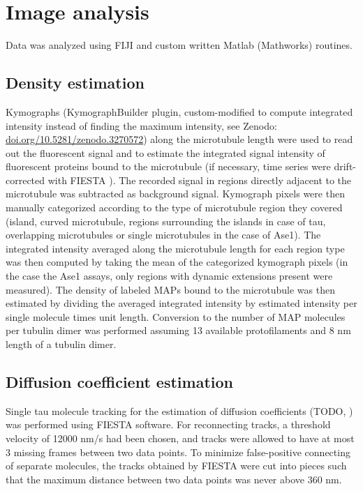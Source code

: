 \section{Image analysis}
\label{methods_analysis}
Data was analyzed using FIJI \parencite{Schindelin2012} and custom written Matlab (Mathworks) routines. 
\subsection{Density estimation}
Kymographs (KymographBuilder plugin, custom-modified to compute integrated intensity instead of finding the maximum intensity, see Zenodo: \url{doi.org/10.5281/zenodo.3270572}) along the microtubule length were used to read out the fluorescent signal and to estimate the integrated signal intensity of fluorescent proteins bound to the microtubule (if necessary, time series were drift-corrected with FIESTA \parencite{RUHNOW20112820}). The recorded signal in regions directly adjacent to the microtubule was subtracted as background signal. Kymograph pixels were then manually categorized according to the type of microtubule region they covered (island, curved microtubule, regions surrounding the islands in case of tau, overlapping microtubules or single microtubules in the case of Ase1). The integrated intensity averaged along the microtubule length for each region type was then computed by taking the mean of the categorized kymograph pixels (in the case the Ase1 assays, only regions with dynamic extensions present were measured). The density of labeled MAPs bound to the microtubule was then estimated by dividing the averaged integrated intensity by estimated intensity per single molecule times unit length. Conversion to the number of MAP molecules per tubulin dimer was performed assuming 13 available protofilaments and 8 nm length of a tubulin dimer.

\subsection{Diffusion coefficient estimation} 
Single tau molecule tracking for the estimation of diffusion coefficients (TODO, ) was performed using FIESTA\parencite{RUHNOW20112820} software. For reconnecting tracks, a threshold velocity of 12000 nm/s had been chosen, and tracks were allowed to have at most 3 missing frames between two data points. To minimize false-positive connecting of separate molecules, the tracks obtained by FIESTA were cut into pieces such that the maximum distance between two data points was never above 360 nm.

